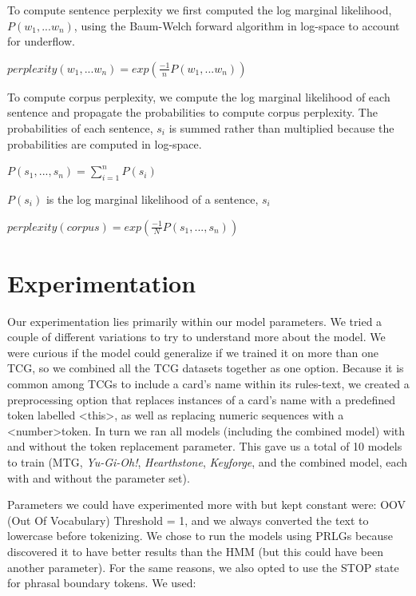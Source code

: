 \documentclass[11pt,a4paper]{article}
\begin{document}
To compute sentence perplexity we first computed the log marginal likelihood, $P(w_1,... w_n)$, using the Baum-Welch forward algorithm in log-space to account for underflow. 

\begin{center}
\small
$perplexity(w_1, ... w_n) = exp(\frac{-1}{n} P(w_1,... w_n))$
\normalsize
\end{center}

To compute corpus perplexity, we compute the log marginal likelihood of each sentence and propagate the probabilities to compute corpus perplexity. The probabilities of each sentence, $s_i$ is summed rather than multiplied because the probabilities are computed in log-space.

\begin{center}
$P(s_1, ..., s_n) = \sum_{i=1}^n P(s_i)$
\end{center}

$P(s_i)$ is the log marginal likelihood of a sentence, $s_i$

\begin{center}
$perplexity(corpus) = exp(\frac{-1}{N} P(s_1, ..., s_n))$
\end{center}

\section{Experimentation}
Our experimentation lies primarily within our model parameters. We tried a couple of different variations to try to understand more about the model. We were curious if the model could generalize if we trained it on more than one TCG, so we combined all the TCG datasets together as one option. Because it is common among TCGs to include a card’s name within its rules-text, we created a preprocessing option that replaces instances of a card’s name with a predefined token labelled \textless this\textgreater, as well as replacing numeric sequences with a \textless number\textgreater token. In turn we ran all models (including the combined model) with and without the token replacement parameter. This gave us a total of 10 models to train (MTG, \emph{Yu-Gi-Oh!}, \emph{Hearthstone}, \emph{Keyforge}, and the combined model, each with and without the parameter set).

Parameters we could have experimented more with but kept constant were: OOV (Out Of Vocabulary) Threshold = 1, and we always converted the text to lowercase before tokenizing. We chose to run the models using PRLGs because \citet{ponvert-etal-2011-simple} discovered it to have better results than the HMM (but this could have been another parameter). For the same reasons, we also opted to use the STOP state for phrasal boundary tokens. We used:
\end{document}

